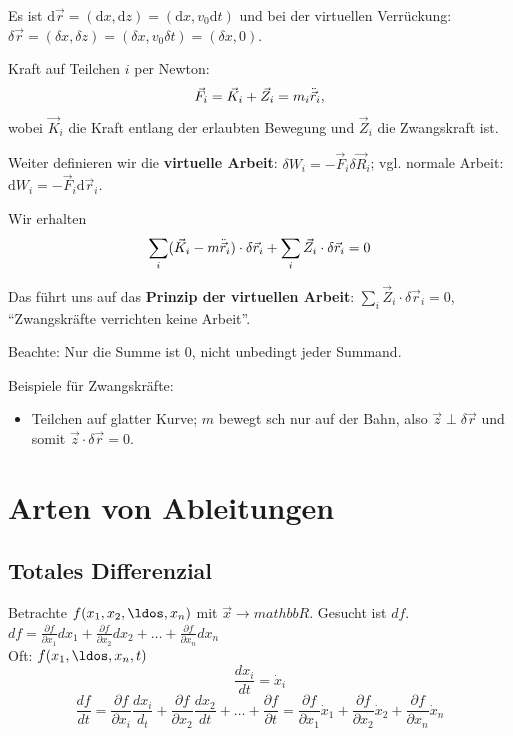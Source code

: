 Es ist $\mathrm{d} \vec{r} = (\mathrm{d} x, \mathrm{d} z) = (\mathrm{d} x, v_0 \mathrm{d} t)$ und bei der virtuellen Verrückung: $\delta \vec{r} = (\delta x, \delta z) = (\delta x, v_0 \delta t) = (\delta x, 0)$.

Kraft auf Teilchen $i$ per Newton: 
\[
	\vec{F}_i = \vec{K}_i + \vec{Z}_i = m_i \ddot{\vec{r}}_i,
\]
wobei $\vec{K}_i$ die Kraft entlang der erlaubten Bewegung und $\vec{Z}_i$ die Zwangskraft ist.

Weiter definieren wir die \textbf{virtuelle Arbeit}: $\delta W_i = - \vec{F}_i \delta \vec{R}_i$; vgl. normale Arbeit: $\mathrm{d} W_i = -\vec{F}_i \mathrm{d} \vec{r}_i$.

Wir erhalten
\[
	\sum_i (\vec{K}_i - m \ddot{\vec{r}}_i) \cdot \delta \vec{r}_i + \sum_i \vec{Z}_i \cdot \delta \vec{r}_i = 0
\]

Das führt uns auf das \textbf{Prinzip der virtuellen Arbeit}: $\sum_i \vec{Z}_i \cdot \delta \vec{r}_i = 0$, "`Zwangskräfte verrichten keine Arbeit"'.

Beachte: Nur die Summe ist $0$, nicht unbedingt jeder Summand.

Beispiele für Zwangskräfte: 
\begin{itemize}
	\item Teilchen auf glatter Kurve; $m$ bewegt sch nur auf der Bahn, also $\vec{z} \perp \delta \vec{r}$ und somit $\vec{z} \cdot \delta \vec{r} = 0$.
\end{itemize}

\section{Arten von Ableitungen}
\subsection{Totales Differenzial}
Betrachte $f(x_1, x_2, \ldos, x_n)$ mit $\vec x \rightarrow mathbb{R}$. Gesucht ist $df$.\\

$df = \frac{\partial f}{\partial x_1} dx_1 + \frac{\partial f}{\partial x_2} dx_2 + \ldots + \frac{\partial f}{\partial x_n} dx_n$\\

Oft: $f(x_1, \ldos, x_n, t)$
\[ \frac{dx_i}{dt} = \dot x_i \]
\[ \frac{df}{dt} = \frac{\partial f}{\partial x_i} \frac{d x_i}{d_t} + \frac{\partial f}{\partial x_2} \frac{d x_2}{d t} + \ldots + \frac{\partial f}{\partial t} = \frac{\partial f}{\partial x_1} \dot x_1 + \frac{\partial f}{\partial x_2} \dot x_2 + \frac{\partial f}{\partial x_n} \dot x_n \]